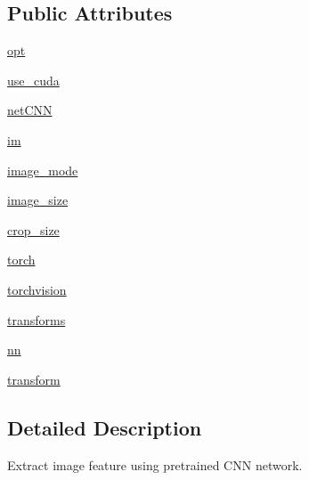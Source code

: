 \subsection*{Public Attributes}
\begin{DoxyCompactItemize}
\item 
\hyperlink{classparlai_1_1core_1_1image__featurizers_1_1ImageLoader_a66f4cdd0e0498467740ba5caed74a479}{opt}
\item 
\hyperlink{classparlai_1_1core_1_1image__featurizers_1_1ImageLoader_a2185015cf2607aab32309949d7f342ba}{use\+\_\+cuda}
\item 
\hyperlink{classparlai_1_1core_1_1image__featurizers_1_1ImageLoader_a1de0a1094d88467725f3f5e95ea632a4}{net\+C\+NN}
\item 
\hyperlink{classparlai_1_1core_1_1image__featurizers_1_1ImageLoader_a5a375010eb3a74e13b227d24ba1dbd71}{im}
\item 
\hyperlink{classparlai_1_1core_1_1image__featurizers_1_1ImageLoader_a41a066168f5df273890bc5629b9282bd}{image\+\_\+mode}
\item 
\hyperlink{classparlai_1_1core_1_1image__featurizers_1_1ImageLoader_a3b16ee0ee30e9a3de6a2f717d5aab57e}{image\+\_\+size}
\item 
\hyperlink{classparlai_1_1core_1_1image__featurizers_1_1ImageLoader_ac576a1193d349be494103b6ea25449b0}{crop\+\_\+size}
\item 
\hyperlink{classparlai_1_1core_1_1image__featurizers_1_1ImageLoader_a4b3a087dd54203cca9f3a8665a48c6d7}{torch}
\item 
\hyperlink{classparlai_1_1core_1_1image__featurizers_1_1ImageLoader_a4c2e2d68b78742c614d6a09b8f9c0257}{torchvision}
\item 
\hyperlink{classparlai_1_1core_1_1image__featurizers_1_1ImageLoader_a6da9f39fc312fc924d80b720f1696595}{transforms}
\item 
\hyperlink{classparlai_1_1core_1_1image__featurizers_1_1ImageLoader_af7d5f6cd8af0bdb87453cbbe6d7e440f}{nn}
\item 
\hyperlink{classparlai_1_1core_1_1image__featurizers_1_1ImageLoader_a4248bee2af90d76ab6f069b0356f5d86}{transform}
\end{DoxyCompactItemize}


\subsection{Detailed Description}
\begin{DoxyVerb}Extract image feature using pretrained CNN network.\end{DoxyVerb}
 

